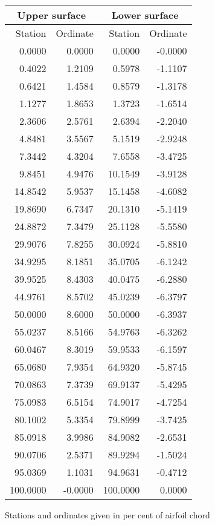 \documentclass[11pt]{book}
\begin{document}
 \hspace{4mm}
 \begin{tabular}{|r|r|r|r|} \hline 
 \multicolumn{2}{|c|}{Upper surface} & \multicolumn{2}{|c|}{Lower surface} \\
 \hline
 Station & Ordinate & Station & Ordinate \\
 \hline
0.0000 & 0.0000 & 0.0000 & -0.0000 \\
0.4022 & 1.2109 & 0.5978 & -1.1107 \\
0.6421 & 1.4584 & 0.8579 & -1.3178 \\
1.1277 & 1.8653 & 1.3723 & -1.6514 \\
2.3606 & 2.5761 & 2.6394 & -2.2040 \\
4.8481 & 3.5567 & 5.1519 & -2.9248 \\
7.3442 & 4.3204 & 7.6558 & -3.4725 \\
9.8451 & 4.9476 & 10.1549 & -3.9128 \\
14.8542 & 5.9537 & 15.1458 & -4.6082 \\
19.8690 & 6.7347 & 20.1310 & -5.1419 \\
24.8872 & 7.3479 & 25.1128 & -5.5580 \\
29.9076 & 7.8255 & 30.0924 & -5.8810 \\
34.9295 & 8.1851 & 35.0705 & -6.1242 \\
39.9525 & 8.4303 & 40.0475 & -6.2880 \\
44.9761 & 8.5702 & 45.0239 & -6.3797 \\
50.0000 & 8.6000 & 50.0000 & -6.3937 \\
55.0237 & 8.5166 & 54.9763 & -6.3262 \\
60.0467 & 8.3019 & 59.9533 & -6.1597 \\
65.0680 & 7.9354 & 64.9320 & -5.8745 \\
70.0863 & 7.3739 & 69.9137 & -5.4295 \\
75.0983 & 6.5154 & 74.9017 & -4.7254 \\
80.1002 & 5.3354 & 79.8999 & -3.7425 \\
85.0918 & 3.9986 & 84.9082 & -2.6531 \\
90.0706 & 2.5371 & 89.9294 & -1.5024 \\
95.0369 & 1.1031 & 94.9631 & -0.4712 \\
100.0000 & -0.0000 & 100.0000 & 0.0000 \\
 \hline 
 \end{tabular}
 \vspace{8mm}

Stations and ordinates given in per cent of airfoil chord
\end{document}
